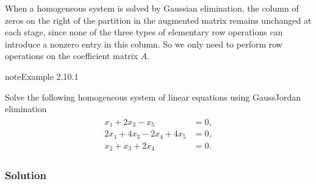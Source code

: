 \documentclass[letterpaper,10pt,english]{jupyterBook}
\begin{document}
\sphinxAtStartPar
When a homogeneous system is solved by Gaussian elimination, the column of zeros on the right of the partition in the augmented matrix remains unchanged at each stage, since none of the three types of elementary row operations can introduce a non\sphinxhyphen{}zero entry in this column. So we only need to perform row operations on the coefficient matrix \(A\).
\label{_pages/2.7_Homogeneous_systems:homogeneous-systems-example}
\begin{sphinxadmonition}{note}{Example 2.10.1}



\sphinxAtStartPar
Solve the following homogeneous system of linear equations using Gauss\sphinxhyphen{}Jordan elimination
\begin{equation*}
\begin{split} \begin{align*}
    x_1 + 2x_3 - x_5 &= 0, \\
    2x_1 + 4x_3 - 2x_4 + 4x_5 &= 0, \\
    x_2 + x_3 +2x_4 &= 0.
\end{align*} \end{split}
\end{equation*}\subsubsection*{Solution}


\end{sphinxadmonition}
\end{document}
